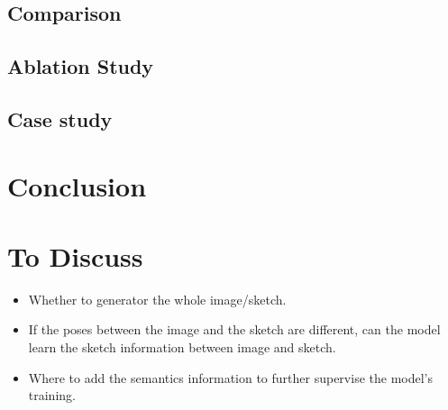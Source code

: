 \documentclass[10pt,twocolumn,letterpaper]{article}
\begin{document}
\subsection{Comparison}

\subsection{Ablation Study}

\subsection{Case study}

\section{Conclusion}

\section{To Discuss}
\begin{itemize}
	\item Whether to generator the whole image/sketch.
	\item If the poses between the image and the sketch are different, can the model learn the sketch information between image and sketch.
	\item Where to add the semantics information to further supervise the model's training.
\end{itemize}


{\small


}
\end{document}

